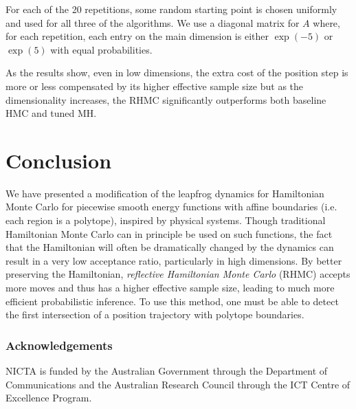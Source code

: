 \documentclass{article} %
\begin{document}
For each of the 20 repetitions, some random starting point is chosen uniformly and used for all three of the algorithms.  We use a diagonal matrix for $A$ where, for each repetition, each entry on the main dimension is either $\exp(-5)$ or $\exp(5)$ with equal probabilities.

As the results show, even in low dimensions, the extra cost of the position step is more or less compensated by its higher effective sample size but as the dimensionality increases, the RHMC significantly outperforms both baseline HMC and tuned MH.




\section{Conclusion}

We have presented a modification of the leapfrog dynamics for Hamiltonian Monte Carlo for piecewise smooth energy functions with affine boundaries (i.e. each region is a polytope), inspired by physical systems.  Though traditional Hamiltonian Monte Carlo can in principle be used on such functions, the fact that the Hamiltonian will often be dramatically changed by the dynamics can result in a very low acceptance ratio, particularly in high dimensions.  By better preserving the Hamiltonian, \emph{reflective Hamiltonian Monte Carlo} (RHMC) accepts more moves and thus has a higher effective sample size, leading to much more efficient probabilistic inference.  To use this method, one must be able to detect the first intersection of a position trajectory with polytope boundaries.


\subsubsection*{Acknowledgements}
NICTA is funded by the Australian Government through the Department of Communications and the Australian Research Council through the ICT Centre of Excellence Program.







\end{document}
